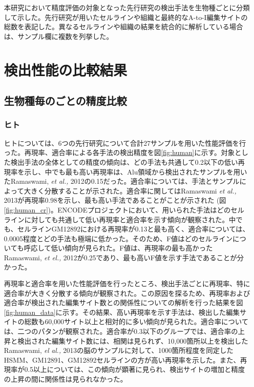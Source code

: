 \begin{flushleft}
	\small{本研究において精度評価の対象となった先行研究の検出手法を生物種ごとに分類して示した。先行研究が用いたセルラインや組織と最終的なA-to-I編集サイトの総数を表記した。異なるセルラインや組織の結果を統合的に解析している場合は、サンプル欄に複数を列挙した。}
\end{flushleft}
\newpage

\section{検出性能の比較結果}
\subsection{生物種毎のごとの精度比較}
\subsubsection{ヒト}
ヒトについては、6つの先行研究について合計27サンプルを用いた性能評価を行った。再現率、適合率による各手法の検出精度を図\ref{fig:human}に示す。対象とした検出手法の全体としての精度の傾向は、どの手法も共通して0.2以下の低い再現率を示し、中でも最も高い再現率は、Alu領域から検出されたサンプルを用いたRamaswami, \textit{et al.,} 2012の0.15だった。適合率については、手法とサンプルによって大きく分散することが示された。適合率に関してはRamaswami \textit{et al.,} 2013が再現率0.98を示し、最も高い手法であることがことが示された (図\ref{fig:human_cr})。ENCODEプロジェクトにおいて、用いられた手法はどのセルラインに対しても共通して低い再現率と適合率を示す傾向が観察された。中でも、セルラインGM12892における再現率が0.13と最も高く、適合率については、0.0005程度とどの手法も極端に低かった。そのため、F値はどのセルラインについても呼応して低い傾向が見られた。F値は、再現率の最も高かったRamaswami, \textit{et el., }2012が0.25であり、最も高いF値を示す手法であることが分かった。
\par
再現率と適合率を用いた性能評価を行ったところ、検出手法ごとに再現率、特に適合率が大きく分散する傾向が観察された。この原因を探るため、再現率および適合率が検出された編集サイト数との関係性についての解析を行った結果を図\ref{fig:human_data}に示す。その結果、高い再現率を示す手法は、検出した編集サイトの総数も60,000サイト以上と相対的に多い傾向が見られた。適合率については、二つのパタンが観察された。適合率が0.3以下のグループでは、適合率の上昇と検出された編集サイト数には、相関は見られず、10,000箇所以上を検出したRamaswami, \textit{el al., }2013の脳のサンプルに対して、1000箇所程度を同定したHSMM、GM12891、GM12892セルラインの方が高い再現率を示した。また、再現率が0.5以上については、この傾向が顕著に見られ、検出サイトの増加と精度の上昇の間に関係性は見られなかった。
